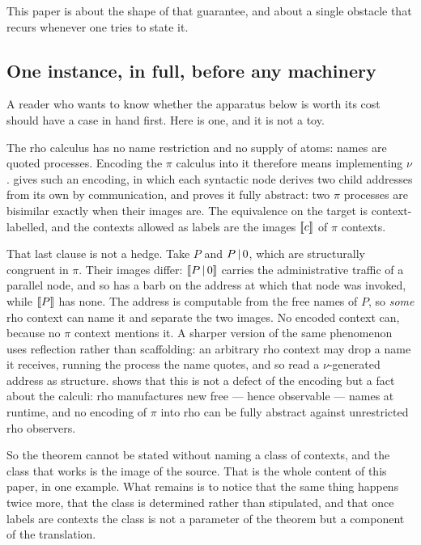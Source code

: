 \documentclass{article}
\begin{document}
This paper is about the shape of that guarantee, and about a single obstacle that recurs whenever one tries to state it.

\subsection{One instance, in full, before any machinery}
\label{sec:vignette}

A reader who wants to know whether the apparatus below is worth its cost should have a case in hand first. Here is one, and it is not a toy.

The rho calculus has no name restriction and no supply of atoms: names are quoted processes. Encoding the $\pi$ calculus into it therefore means implementing $\nu$.  gives such an encoding, in which each syntactic node derives two child addresses from its own by communication, and proves it fully abstract: two $\pi$ processes are bisimilar exactly when their images are. The equivalence on the target is context-labelled, and the contexts allowed as labels are the images $[\![c]\!]$ of $\pi$ contexts.

That last clause is not a hedge. Take $P$ and $P\,|\, 0$, which are structurally congruent in $\pi$. Their images differ: $[\![P\,|\, 0]\!]$ carries the administrative traffic of a parallel node, and so has a barb on the address at which that node was invoked, while $[\![P]\!]$ has none. The address is computable from the free names of $P$, so \emph{some} rho context can name it and separate the two images. No encoded context can, because no $\pi$ context mentions it. A sharper version of the same phenomenon uses reflection rather than scaffolding: an arbitrary rho context may drop a name it receives, running the process the name quotes, and so read a $\nu$-generated address as structure.  shows that this is not a defect of the encoding but a fact about the calculi: rho manufactures new free --- hence observable --- names at runtime, and no encoding of $\pi$ into rho can be fully abstract against unrestricted rho observers.

So the theorem cannot be stated without naming a class of contexts, and the class that works is the image of the source. That is the whole content of this paper, in one example. What remains is to notice that the same thing happens twice more, that the class is determined rather than stipulated, and that once labels are contexts the class is not a parameter of the theorem but a component of the translation.
\end{document}
